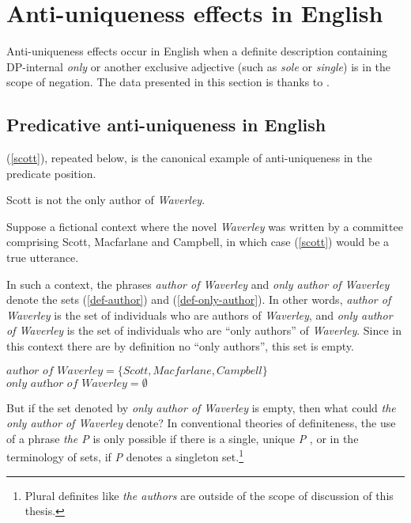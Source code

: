 \section{Anti-uniqueness effects in English \label{sec:anti-uniqueness-english}}
Anti-uniqueness effects occur in English when a definite description containing DP-internal \textit{only} or another exclusive adjective (such as \textit{sole} or \textit{single}) is in the scope of negation. The data presented in this section is thanks to \citet{cb2012b, cb2015}.

\subsection{Predicative anti-uniqueness in English}
(\ref{scott}), repeated below, is the canonical example of anti-uniqueness in the predicate position.

\begin{exe}
	 Scott is not the only author of \textit{Waverley}.
\end{exe}

Suppose a fictional context where the novel \textit{Waverley} was written by a committee comprising Scott, Macfarlane and Campbell, in which case (\ref{scott}) would be a true utterance.

In such a context, the phrases \textit{author of Waverley} and \textit{only author of Waverley} denote the sets (\ref{def-author}) and (\ref{def-only-author}). In other words, \textit{author of Waverley} is the set of individuals who are authors of \textit{Waverley}, and \textit{only author of Waverley} is the set of individuals who are ``only authors'' of \textit{Waverley}. Since in this context there are by definition no ``only authors'', this set is empty.

\begin{exe}
	\ex \label{def-author} $\textit{author of Waverley} = \lbrace Scott, Macfarlane, Campbell \rbrace$
	\ex \label{def-only-author} $\textit{only author of Waverley} = \emptyset$
\end{exe}

But if the set denoted by \textit{only author of Waverley} is empty, then what could \textit{the only author of Waverley} denote? In conventional theories of definiteness, the use of a phrase \textit{the P} is only possible if there is a single, unique \textit{P} \citep{horn-abbott-2012}, or in the terminology of sets, if \textit{P} denotes a singleton set.\footnote{Plural definites like \textit{the authors} are outside of the scope of discussion of this thesis.}

